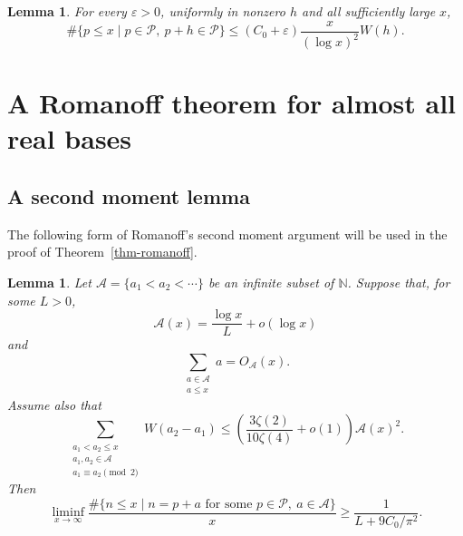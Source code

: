 \documentclass[11pt,reqno]{amsart}
\numberwithin{equation}{section}
\newtheorem{lemma}[theorem]{Lemma}
\begin{document}
    \begin{lemma}\label{lem-sieve}
        For every $\varepsilon>0$, uniformly in nonzero $h$ and all sufficiently large $x$,
        $$
        \#\{p\le x\mid p\in\mathcal{P},\ p+h\in\mathcal{P}\}
        \le (C_0+\varepsilon)\frac{x}{(\log x)^2}W(h).
        $$
    \end{lemma}

    \section{A Romanoff theorem for almost all real bases}\label{sec-romanoff-proof}

    \subsection{A second moment lemma}

    The following form of Romanoff's second moment argument will be used in the proof of Theorem~\ref{thm-romanoff}.

    \begin{lemma}\label{lem-romanoff-criterion}
        Let $\mathcal{A}=\{a_1<a_2<\cdots\}$ be an infinite subset of $\mathbb{N}$. Suppose that, for some $L>0$,
        \begin{equation}\label{eq-A-count-L}
            \mathcal{A}(x)=\frac{\log x}{L}+o(\log x)
        \end{equation}
        and
        \begin{equation}\label{eq-A-sum-small}
            \sum_{\substack{a\in\mathcal{A}\\a\le x}}a=O_{\mathcal{A}}(x).
        \end{equation}
        Assume also that
        \begin{equation}\label{eq-even-pair-condition}
            \sum_{\substack{a_1<a_2\le x\\
                    a_1,a_2\in\mathcal{A}\\
                    a_1\equiv a_2\pmod2}}
            W(a_2-a_1)
            \le \left(\frac{3\zeta(2)}{10\zeta(4)}+o(1)\right)\mathcal{A}(x)^2.
        \end{equation}
        Then
        $$
        \liminf_{x\to\infty}
        \frac{\#\{n\le x\mid n=p+a\text{ for some }p\in\mathcal{P},\ a\in\mathcal{A}\}}{x}
        \ge \frac{1}{L+9C_0/\pi^2}.
        $$
    \end{lemma}
\end{document}
